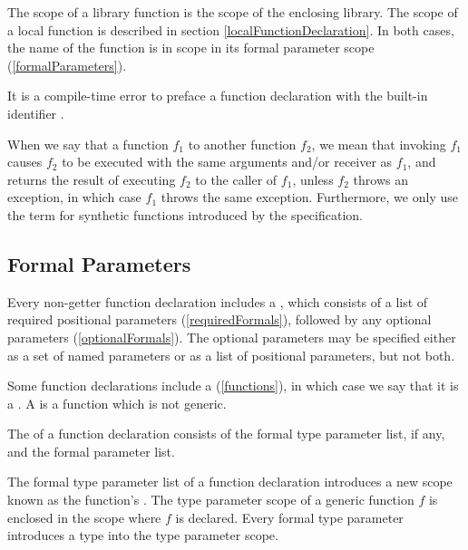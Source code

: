 \documentclass[makeidx]{article}
\begin{document}
\LMHash{}%
The scope of a library function is the scope of the enclosing library.
The scope of a local function is described in section \ref{localFunctionDeclaration}.
In both cases, the name of the function is in scope in its formal parameter scope (\ref{formalParameters}).

\LMHash{}%
It is a compile-time error to preface a function declaration with the built-in identifier \STATIC{}.

\LMHash{}%
When we say that a function $f_1$  to another function $f_2$, we mean that invoking $f_1$ causes $f_2$ to be executed with the same arguments and/or receiver as $f_1$, and returns the result of executing $f_2$ to the caller of $f_1$, unless $f_2$ throws an exception, in which case $f_1$ throws the same exception.
Furthermore, we only use the term for synthetic functions introduced by the specification.


\subsection{Formal Parameters}

\LMHash{}%
Every non-getter function declaration includes a ,
which consists of a list of required positional parameters (\ref{requiredFormals}),
followed by any optional parameters (\ref{optionalFormals}).
The optional parameters may be specified either as a set of named parameters or as a list of positional parameters, but not both.

\LMHash{}%
Some function declarations include a
 (\ref{functions}),
in which case we say that it is a
.
A 
is a function which is not generic.

\LMHash{}%
The  of a function declaration consists of the formal type parameter list, if any, and the formal parameter list.


\LMHash{}%
The formal type parameter list of a function declaration introduces
a new scope known as the function's
.
The type parameter scope of a generic function $f$ is enclosed in the scope where $f$ is declared.
Every formal type parameter introduces a type into the type parameter scope.
\end{document}
